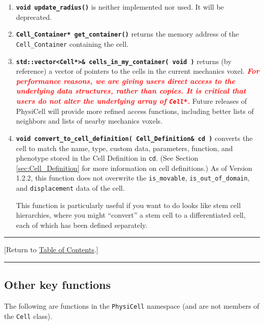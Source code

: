 \documentclass[12pt]{article}
\renewcommand{\v}{\verb}
\newcommand{\smallcode}[1]{\textbf{\texttt{#1}}}
\newcommand{\red}[1]{\textcolor{red}{#1}}
\newcommand{\TOClink}{\begin{center}\hrule\vskip-5pt\phantom{.}\hfill[Return to \hyperlink{TOC}{Table of Contents}.]\hfill\phantom{.}\vskip3pt\hrule\end{center}}
\begin{document}
\begin{enumerate}
\item 
\smallcode{void update\_radius()} is neither implemented nor used. It will 
be deprecated. 

\item 
\smallcode{Cell\_Container* get\_container()} returns the memory 
address of the \v|Cell_Container| containing the cell. 

\item 
\smallcode{std::vector<Cell*>\& cells\_in\_my\_container( void )} returns (by reference) 
a vector of pointers to the cells in the current mechanics voxel. 
\red{\textbf{\emph{For performance reasons, we are giving users direct access to the underlying 
data structures, rather than copies. It is critical that users do not alter the underlying 
array of \texttt{Cell*}.}}} Future releases of PhysiCell will provide more refined 
access functions, including better lists of neighbors and lists of 
nearby mechanics voxels. 

\item 
\smallcode{void convert\_to\_cell\_definition( Cell\_Definition\& cd )} converts 
the cell to match the name, type, custom data, parameters, function, and phenotype 
stored in the Cell Definition in \verb+cd+. (See Section \ref{sec:Cell_Definition} for more 
information on cell definitions.) As of Version 1.2.2, this function does not overwrite 
the \v|is_movable|, \v|is_out_of_domain|, and \v|displacement| data of the cell. 

This function is particularly useful if you want to do looks like stem cell hierarchies, where you 
might ``convert'' a stem cell to a differentiated cell, each of which has been defined 
separately. 

\end{enumerate} 

\TOClink 

\subsection{Other key functions}
\label{sec:other_key_cell_functions}
The following are functions in the \v|PhysiCell| namespace 
(and are not members of the \v|Cell| class). 
\end{document}
